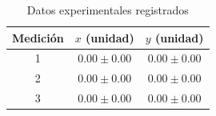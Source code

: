\begin{table}[htbp]
\centering
\caption{Datos experimentales registrados}
\label{tab:datos}
\begin{tabular}{ccc}
\toprule
\textbf{Medición} & \textbf{$x$ (\si{unidad})} & \textbf{$y$ (\si{unidad})} \\
\midrule
1 & $0.00 \pm 0.00$ & $0.00 \pm 0.00$ \\
2 & $0.00 \pm 0.00$ & $0.00 \pm 0.00$ \\
3 & $0.00 \pm 0.00$ & $0.00 \pm 0.00$ \\
\bottomrule
\end{tabular}
\end{table}

